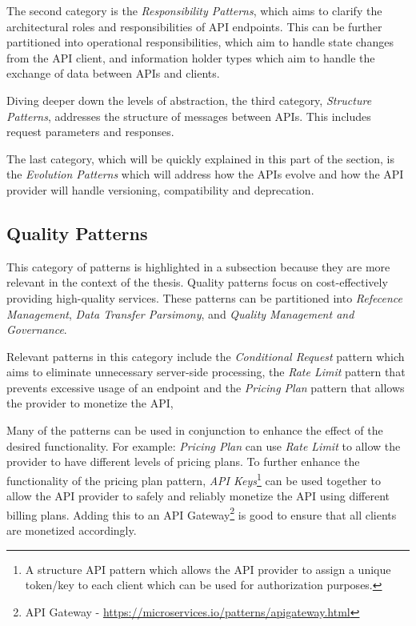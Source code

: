The second category is the \textit{Responsibility Patterns}, which aims to clarify the architectural roles and responsibilities of API endpoints.
This can be further partitioned into operational responsibilities, which aim to handle state changes from the API client, and information holder types which aim to handle the exchange of data between APIs and clients.

Diving deeper down the levels of abstraction, the third category, \textit{Structure Patterns}, addresses the structure of messages between APIs. This includes request parameters and responses.

The last category, which will be quickly explained in this part of the section, is the \textit{Evolution Patterns} which will address how the APIs evolve and how the API provider will handle versioning, compatibility and deprecation.

\subsection{Quality Patterns}
This category of patterns is highlighted in a subsection because they are more relevant in the context of the thesis. 
Quality patterns focus on cost-effectively providing high-quality services. These patterns can be partitioned into \textit{Refecence Management}, \textit{Data Transfer Parsimony}, and \textit{Quality Management and Governance}.

Relevant patterns in this category include the \textit{Conditional Request} pattern which aims to eliminate unnecessary server-side 
processing, the \textit{Rate Limit} pattern that prevents excessive usage of an endpoint and the \textit{Pricing Plan} pattern that allows the provider to monetize the API,

Many of the patterns can be used in conjunction to enhance the effect of the desired functionality. For example: \textit{Pricing Plan} can use \textit{Rate Limit} to allow the provider to have different levels of pricing plans.
To further enhance the functionality of the pricing plan pattern, \textit{API Keys}\footnote{A structure API pattern which allows the API provider
to assign a unique token/key to each client which can be used for authorization purposes.} can be used together to allow the API provider to safely and reliably monetize the API using different billing plans. 
Adding this to an API Gateway\footnote{API Gateway - \url{https://microservices.io/patterns/apigateway.html}} is good to ensure that all clients are monetized accordingly.

